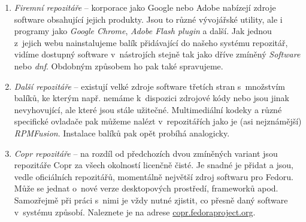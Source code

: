 \begin{enumerate}
\item \emph{Firemní repozitáře} -- korporace jako Google nebo Adobe nabízejí zdroje software obsahující jejich produkty. Jsou to různé vývojářské utility, ale i programy jako \emph{Google Chrome}, \emph{Adobe Flash plugin} a další. Jak jednou z~jejich webu nainstalujeme balík přidávající do našeho systému repozitář, vidíme dostupný software v~nástrojích stejně tak jako dříve zmíněný \emph{Software} nebo \emph{dnf}. Obdobným způsobem ho pak také spravujeme.

\item \emph{Další repozitáře} -- existují velké zdroje software třetích stran s~množstvím balíků, ke kterým např. nemáme k~dispozici zdrojové kódy nebo jsou jinak nevyhovující, ale které jsou stále užitečné. Multimediální kodeky a různé specifické ovladače pak můžeme nalézt v~repozitářích jako je (asi nejznámější) \emph{RPMFusion}. Instalace balíků pak opět probíhá analogicky.

\item \emph{Copr repozitáře} -- na rozdíl od předchozích dvou zmíněných variant jsou repozitáře Copr za všech okolností licenčně čisté. Je snadné je přidat a jsou, vedle oficiálních repozitářů, momentálně největší zdroj softwaru pro Fedoru. Může se jednat o~nové verze desktopových prostředí, frameworků apod. Samozřejmě při práci s~nimi je vždy nutné zjistit, co přesně daný software v~systému způsobí. Naleznete je na adrese \url{copr.fedoraproject.org}.

\end{enumerate}
